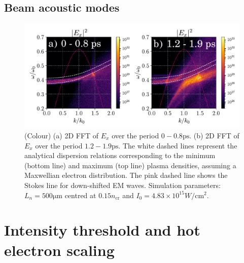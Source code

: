 \subsection{Beam acoustic modes}
\begin{figure}[ht]
    \centering
    \includegraphics[width=0.8\columnwidth]{Chapters/C4_iSRS/fig5_5a_5b.pdf}
    \caption{(Colour) (a) 2D FFT of $E_x$ over the period $ 0 - 0.8 \si{\pico\second}$. (b) 2D FFT of $E_x$ over the period $1.2 - 1.9                                                                              
    \si{\pico\second}$.
    The white dashed lines represent the analytical dispersion relations corresponding to the minimum (bottom line) and maximum (top line) plasma densities,
    assuming a Maxwellian electron distribution.
    The pink dashed line shows the Stokes line for down-shifted EM waves.
    Simulation parameters: $L_n = 500 \si{\micro\metre} $ centred at $0.15n_\mathrm{cr}$
    and $I_0 = 4.83\times10^{15} \si{W/\centi\metre^2}$.
    }
    \label{fig:BAM}
\end{figure}{}



\section{Intensity threshold and hot electron scaling}\label{sec:paramScan}

